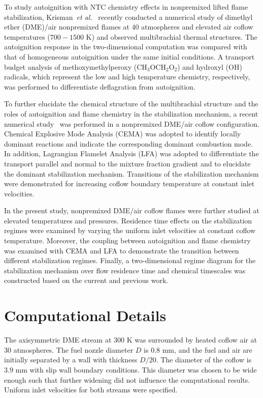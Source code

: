 \documentclass{wssci}
\begin{document}
To study autoignition with NTC chemistry effects in nonpremixed lifted flame stabilization, Krisman~\emph{et al.}~\cite{krisman14} recently conducted a numerical study of dimethyl ether (DME)/air nonpremixed flames at $40$ atmospheres and elevated air coflow temperatures ($700-1500$ K) and observed multibrachial thermal structures.  The autoignition response in the two-dimensional computation was compared with that of homogeneous autoignition under the same initial conditions.  A transport budget analysis of methoxymethylperoxy (CH$_3$OCH$_2$O$_2$) and hydroxyl (OH) radicals, which represent the low and high temperature chemistry, respectively, was performed to differentiate deflagration from autoignition.  

To further elucidate the chemical structure of the multibrachial structure and the roles of autoignition and flame chemistry in the stabilization mechanism, a recent numerical study~\cite{deng15} was performed in a nonpremixed DME/air coflow configuration.  Chemical Explosive Mode Analysis (CEMA) was adopted to identify locally dominant reactions and indicate the corresponding dominant combustion mode.  In addition, Lagrangian Flamelet Analysis (LFA) was adopted to differentiate the transport parallel and normal to the mixture fraction gradient and to elucidate the dominant stabilization mechanism.  Transitions of the stabilization mechanism were demonstrated for increasing coflow boundary temperature at constant inlet velocities.

In the present study, nonpremixed DME/air coflow flames were further studied at elevated temperatures and pressures.  Residence time effects on the stabilization regimes were examined by varying the uniform inlet velocities at constant coflow temperature.  Moreover, the coupling between autoignition and flame chemistry was examined with CEMA and LFA to demonstrate the transition between different stabilization regimes.  Finally, a two-dimensional regime diagram for the stabilization mechanism over flow residence time and chemical timescales was constructed based on the current and previous work.                        

\section{Computational Details}

The axisymmetric DME stream at $300$ K was surrounded by heated coflow air at $30$ atmospheres.  The fuel nozzle diameter $D$ is $0.8$ mm, and the fuel and air are initially separated by a wall with thickness $D/20$.  The diameter of the coflow is $3.9$ mm with slip wall boundary conditions.  This diameter was chosen to be wide enough such that further widening did not influence the computational results.  Uniform inlet velocities for both streams were specified.
\end{document}
